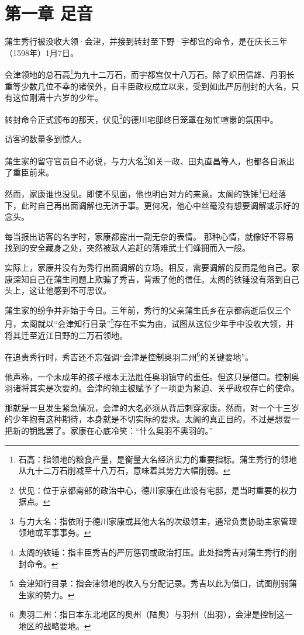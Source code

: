 \documentclass[
]{article}
\begin{document}
\section*{第一章 足音}\label{ux7b2cux4e00ux7ae0-ux8db3ux97f3}

蒲生秀行被没收大领·会津，并接到转封至下野·宇都宫的命令，是在庆长三年（1598年）1月7日。

会津领地的总石高\footnote{石高：指领地的粮食产量，是衡量大名经济实力的重要指标。蒲生秀行的领地从九十二万石削减至十八万石，意味着其势力大幅削弱。}为九十二万石，而宇都宫仅十八万石。除了织田信雄、丹羽长重等少数几位不幸的诸侯外，自丰臣政权成立以来，受到如此严厉削封的大名，只有这位刚满十六岁的少年。

转封命令正式颁布的那天，伏见\footnote{伏见：位于京都南部的政治中心，德川家康在此设有宅邸，是当时重要的权力据点。}的德川宅邸终日笼罩在匆忙喧嚣的氛围中。

访客的数量多到惊人。

蒲生家的留守官员自不必说，与力大名\footnote{与力大名：指依附于德川家康或其他大名的次级领主，通常负责协助主家管理领地或军事事务。}如关一政、田丸直昌等人，也都各自派出了重臣前来。

然而，家康谁也没见。即使不见面，他也明白对方的来意。太阁的铁锤\footnote{太阁的铁锤：指丰臣秀吉的严厉惩罚或政治打压。此处指秀吉对蒲生秀行的削封命令。}已经落下，此时自己再出面调解也无济于事。更何况，他心中丝毫没有想要调解或示好的念头。

每当报出访客的名字时，家康都露出一副无奈的表情。
那种心情，就像好不容易找到的安全藏身之处，突然被敌人追赶的落难武士们蜂拥而入一般。

实际上，家康并没有为秀行出面调解的立场。相反，需要调解的反而是他自己。家康深知自己在蒲生问题上欺骗了秀吉，背叛了他的信任。太阁的铁锤没有落到自己头上，这让他感到不可思议。

蒲生家的纷争并非始于今日。三年前，秀行的父亲蒲生氏乡在京都病逝后仅三个月，太阁就以``会津知行目录''\footnote{会津知行目录：指会津领地的收入与分配记录。秀吉以此为借口，试图削弱蒲生家的势力。}存在不实为由，试图从这位少年手中没收大领，并将其迁至近江日野的二万石领地。

在追责秀行时，秀吉还不忘强调``会津是控制奥羽二州\footnote{奥羽二州：指日本东北地区的奥州（陆奥）与羽州（出羽），会津是控制这一地区的战略要地。}的关键要地''。

他声称，一个未成年的孩子根本无法胜任奥羽镇守的重任。但这只是借口。控制奥羽诸将其实是次要的。会津的领主被赋予了一项更为紧迫、关乎政权存亡的使命。

那就是一旦发生紧急情况，会津的大名必须从背后刺穿家康。然而，对一个十三岁的少年抱有这种期待，本身就是不切实际的要求。太阁的真正目的，不过是想要一把新的钥匙罢了。家康在心底冷笑：``什么奥羽不奥羽的。''
\end{document}
